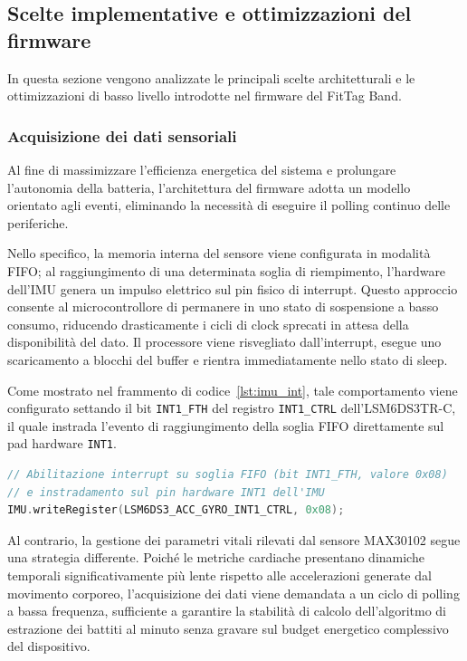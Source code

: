 \subsection{Scelte implementative e ottimizzazioni del firmware}

In questa sezione vengono analizzate le principali scelte architetturali e le ottimizzazioni di basso livello introdotte nel firmware del FitTag Band.

\subsubsection{Acquisizione dei dati sensoriali}
Al fine di massimizzare l'efficienza energetica del sistema e prolungare l'autonomia della batteria, l'architettura del firmware adotta un modello orientato agli eventi, eliminando la necessità di eseguire il polling continuo delle periferiche.

Nello specifico, la memoria interna del sensore viene configurata in modalità FIFO; al raggiungimento di una determinata soglia di riempimento, l'hardware dell'IMU genera un impulso elettrico sul pin fisico di interrupt.
Questo approccio consente al microcontrollore di permanere in uno stato di sospensione a basso consumo, riducendo drasticamente i cicli di clock sprecati in attesa della disponibilità del dato.
Il processore viene risvegliato dall'interrupt, esegue uno scaricamento a blocchi del buffer e rientra immediatamente nello stato di sleep.

Come mostrato nel frammento di codice~\ref{lst:imu_int}, tale comportamento viene configurato settando il bit \texttt{INT1\_FTH} del registro \texttt{INT1\_CTRL} dell'LSM6DS3TR-C, il quale instrada l'evento di raggiungimento della soglia FIFO direttamente sul pad hardware \texttt{INT1}.

\begin{lstlisting}[language=C++, caption={Configurazione del registro di controllo interrupt per l'unità inerziale.}, label=lst:imu_int]
// Abilitazione interrupt su soglia FIFO (bit INT1_FTH, valore 0x08) 
// e instradamento sul pin hardware INT1 dell'IMU
IMU.writeRegister(LSM6DS3_ACC_GYRO_INT1_CTRL, 0x08);
\end{lstlisting}

Al contrario, la gestione dei parametri vitali rilevati dal sensore MAX30102 segue una strategia differente. Poiché le metriche cardiache presentano dinamiche temporali significativamente più lente rispetto alle accelerazioni generate dal movimento corporeo, l'acquisizione dei dati viene demandata a un ciclo di polling a bassa frequenza, sufficiente a garantire la stabilità di calcolo dell'algoritmo di estrazione dei battiti al minuto senza gravare sul budget energetico complessivo del dispositivo.

